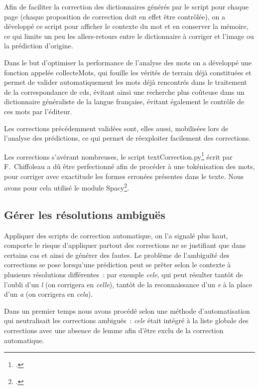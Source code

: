 \documentclass[a4paper,12pt,twoside]{book}
\begin{document}
				Afin de faciliter la correction des dictionnaires générés par le script pour chaque page (chaque proposition de correction doit en effet être contrôlée), on a développé ce script pour afficher le contexte du mot et en conserver la mémoire, ce qui limite un peu les allers-retours entre le dictionnaire à corriger et l'image ou la prédiction d'origine.
				
				Dans le but d'optimiser la performance de l'analyse des mots on a développé une fonction appelée \textsf{collecteMots}, qui fouille les vérités de terrain déjà constituées et permet de valider automatiquement les mots déjà rencontrés dans le traitement de la correspondance de \gls{cds}, évitant ainsi une recherche plus coûteuse dans un dictionnaire généraliste de la langue française, évitant également le contrôle de ces mots par l'éditeur.
				
				Les corrections précédemment validées sont, elles aussi, mobilisées lors de l'analyse des prédictions, ce qui permet de réexploiter facilement des corrections.
				
				Les corrections s'avérant nombreuses, le script \textsf{textCorrection.py}\footcite{biayTextCorrectionPy2022} écrit par F.~Chiffoleau a dû être perfectionné afin de procéder à une tokénisation des mots, pour corriger avec exactitude les formes erronées présentes dans le texte. Nous avons pour cela utilisé le module Spacy\footcite{SpaCyIndustrialstrengthNatural}.
								
			\subsection{Gérer les résolutions ambiguës}
				Appliquer des scripts de correction automatique, on l'a signalé plus haut, comporte le risque d'appliquer partout des corrections ne se justifiant que dans certains cas et ainsi de générer des fautes. Le problème de l'ambiguïté des corrections se pose lorsqu'une prédiction peut se prêter selon le contexte à plusieurs résolutions différentes~: par exemple \textit{cele}, qui peut résulter tantôt de l'oubli d'un \textit{l} (on corrigera en \textit{celle}), tantôt de la reconnaissance d'un \textit{e} à la place d'un \textit{a} (on corrigera en \textit{cela}).
							
				Dans un premier temps nous avons procédé selon une méthode d'automatisation qui neutralisait les corrections ambiguës~: \textit{cele} était intégré à la liste globale des corrections avec une absence de lemme afin d'être exclu de la correction automatique.
				
\end{document}
